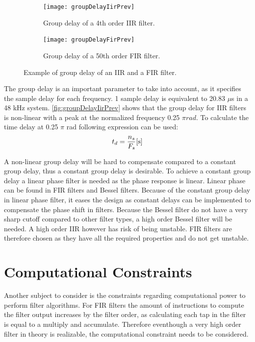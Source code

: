 \begin{figure}[H]
\centering
\begin{subfigure}[t]{0.435\textwidth}
\texttt{[image: groupDelayIirPrev]}
	\caption{Group delay of a 4th order IIR filter.}
	\label{fig:groupDelayIirPrev}
\end{subfigure}
\hspace{6mm} 
\begin{subfigure}[t]{0.47\textwidth}
\texttt{[image: groupDelayFirPrev]}
	\caption{Group delay of a 50th order FIR filter.}
	\label{fig:groupDelayFirPrev}
\end{subfigure}
\caption{Example of group delay of an IIR and a FIR filter.}
\label{fig:filterGroupDelay}
\end{figure}

The group delay is an important parameter to take into account, as it specifies the sample delay for each frequency. 1 sample delay is equivalent to 20.83 $\mu$s in a 48 kHz system. \autoref{fig:groupDelayIirPrev} shows that the group delay for IIR filters is non-linear with a peak at the normalized frequency 0.25 $\pi rad$. To calculate the time delay at 0.25 $\pi$ rad following expression can be used:
\begin{equation}
t_{d}= \frac{n_{s}}{F_s} \enhed{s}
\end{equation}
\begin{where}
\end{where}

A non-linear group delay will be hard to compensate compared to a constant group delay, thus a constant group delay is desirable. To achieve a constant group delay a linear phase filter is needed as the phase response is linear. Linear phase can be found in FIR filters and Bessel filters. Because of the constant group delay in linear phase filter, it eases the design as constant delays can be implemented to compensate the phase shift in filters. Because the Bessel filter do not have a very sharp cutoff compared to other filter types, a high order Bessel filter will be needed. A high order IIR however has risk of being unstable. FIR filters are therefore chosen as they have all the required properties and do not get unstable. 


\section{Computational Constraints}
Another subject to consider is the constraints regarding computational power to perform filter algorithms. For FIR filters the amount of instructions to compute the filter output increases by the filter order, as calculating each tap in the filter is equal to a multiply and accumulate. Therefore eventhough a very high order filter in theory is realizable, the computational constraint needs to be considered. 

